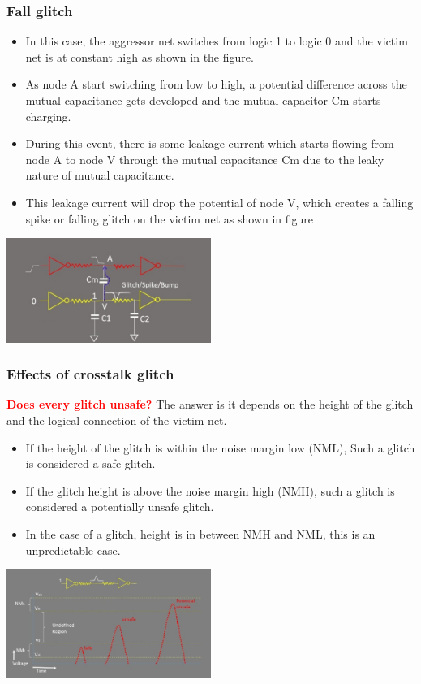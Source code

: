 \documentclass{beamer}
\begin{document}
	\begin{frame}
	\frametitle{Fall glitch}
	\begin{itemize}
		\item In this case, the aggressor net switches from logic 1 to logic 0 and the victim net is at constant high as shown in the figure.
		\item As node A start switching from low to high, a potential difference across the mutual capacitance gets developed and the mutual capacitor Cm starts charging.
		\item During this event, there is some leakage current which starts flowing from node A to node V through the mutual capacitance Cm due to the leaky nature of mutual capacitance.
		\item This leakage current will drop the potential of node V, which creates a falling spike or falling glitch on the victim net as shown in figure
	\end{itemize}
	\begin{center}
		\includegraphics[width=0.5\textwidth]{fall_glitch}
	\end{center}
	\end{frame}	
	\begin{frame}
		\frametitle{Effects of crosstalk glitch}
	\textcolor{red}{\textbf{Does every glitch unsafe?}}
	\newline
	The answer is it depends on the height of the glitch and the logical connection of the victim net. 
	\begin{itemize}
		\item If the height of the glitch is within the noise margin low (NML), Such a glitch is considered a safe glitch.
		\item If the glitch height is above the noise margin high (NMH), such a glitch is considered a potentially unsafe glitch. 
		\item In the case of a glitch, height is in between NMH and NML, this is an unpredictable case.
	\end{itemize}
			\begin{center}
			\includegraphics[width=0.5\textwidth]{safeandunsafeglitch}
		\end{center}
	\end{frame}	
\end{document}
